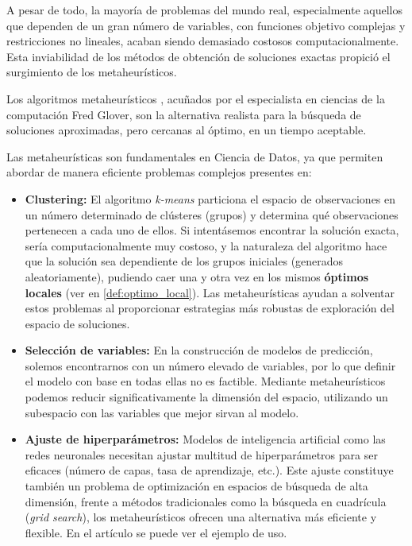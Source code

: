\documentclass[12pt,a4paper]{book}
\begin{document}
A pesar de todo, la mayoría de problemas del mundo real, especialmente aquellos que dependen de un gran número de variables, con funciones objetivo complejas y restricciones no lineales, acaban siendo demasiado costosos computacionalmente. Esta inviabilidad de los métodos de obtención de soluciones exactas propició el surgimiento de los metaheurísticos.

Los algoritmos metaheurísticos \citep{metaheuristicos}, acuñados por el especialista en ciencias de la computación Fred Glover,
son la alternativa realista para la búsqueda de soluciones aproximadas, pero cercanas al óptimo, en un tiempo aceptable.

Las metaheurísticas son fundamentales en Ciencia de Datos, ya que permiten abordar de manera eficiente problemas complejos presentes en:

\begin{itemize}
    \item \textbf{Clustering:} El algoritmo \textit{k-means} \citep{k-means} particiona el espacio de observaciones en un número determinado de clústeres (grupos) y determina qué observaciones pertenecen a cada uno de ellos. 
    Si intentásemos encontrar la solución exacta, sería computacionalmente muy costoso, y la naturaleza del algoritmo hace que la solución sea dependiente de los grupos iniciales (generados aleatoriamente), pudiendo caer una y otra vez en los mismos \textbf{óptimos locales} (ver en \ref{def:optimo_local}).
    Las metaheurísticas ayudan a solventar estos problemas al proporcionar estrategias más robustas de exploración del espacio de soluciones.
    
    \item \textbf{Selección de variables:} En la construcción de modelos de predicción, solemos encontrarnos con un número elevado de variables, por lo que definir el modelo con base en todas ellas no es factible. Mediante metaheurísticos podemos 
    reducir significativamente la dimensión del espacio, utilizando un subespacio con las variables que mejor sirvan al modelo.
    
    \item \textbf{Ajuste de hiperparámetros:} Modelos de inteligencia artificial como las redes neuronales necesitan ajustar multitud de hiperparámetros para ser eficaces (número de capas, tasa de aprendizaje, etc.). Este ajuste constituye también un problema de optimización en espacios de búsqueda de alta dimensión, frente a métodos tradicionales como la búsqueda en cuadrícula (\textit{grid search}), los metaheurísticos ofrecen una alternativa más eficiente y flexible. En el artículo \cite{hyperparameters} se puede ver el ejemplo de uso.
\end{itemize}
\end{document}
